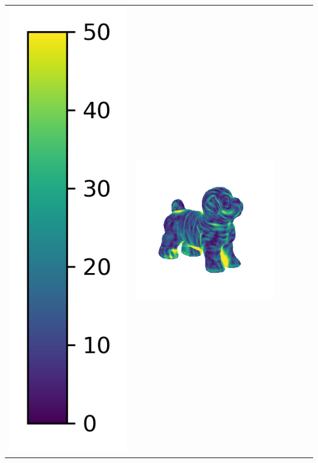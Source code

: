 \begin{tabularx}{\linewidth}{@{}Y@{}Y@{}Y@{}Y@{}Y@{}Y@{}}
\includegraphics[width=0.2\linewidth]{semisynthetic/colorbar_error_vertical.png} &
\includegraphics[width=\linewidth]{semisynthetic/20150514_17_ours_err.png} &

\end{tabularx}

